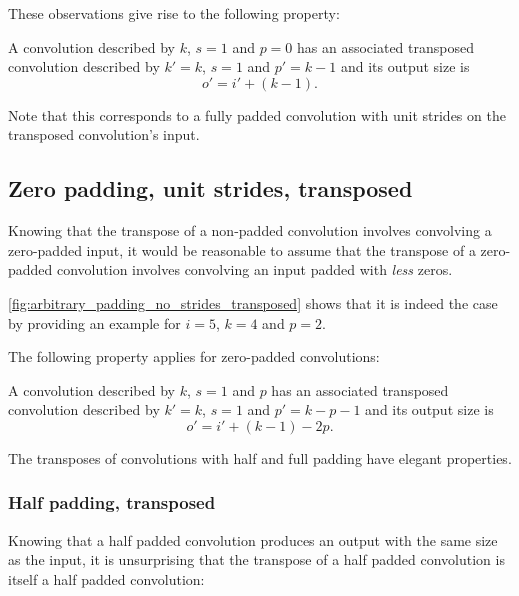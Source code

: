 \documentclass{article}
\begin{document}
These observations give rise to the following property:

\begin{prop}\label{prop:no_padding_no_strides_transposed}
A convolution described by $k$, $s = 1$ and $p = 0$ has an associated transposed
convolution described by $k' = k$, $s = 1$ and $p' = k - 1$ and its output size
is
\begin{equation*}
    o' = i' + (k - 1).
\end{equation*}
\end{prop}

Note that this corresponds to a fully padded convolution with unit strides on
the transposed convolution's input.

\subsection{Zero padding, unit strides, transposed}

Knowing that the transpose of a non-padded convolution involves convolving a
zero-padded input, it would be reasonable to assume that the transpose of a
zero-padded convolution involves convolving an input padded with {\em less}
zeros.

\autoref{fig:arbitrary_padding_no_strides_transposed} shows that it is indeed
the case by providing an example for $i = 5$, $k = 4$ and $p = 2$.

The following property applies for zero-padded convolutions:

\begin{prop}\label{prop:arbitrary_padding_no_strides_transposed}
A convolution described by $k$, $s = 1$ and $p$ has an associated transposed
convolution described by $k' = k$, $s = 1$ and $p' = k - p - 1$ and its output
size is
\begin{equation*}
    o' = i' + (k - 1) - 2p.
\end{equation*}
\end{prop}

The transposes of convolutions with half and full padding have elegant
properties.

\subsubsection{Half padding, transposed}

Knowing that a half padded convolution produces an output with the same size as
the input, it is unsurprising that the transpose of a half padded convolution
is itself a half padded convolution:
\end{document}
